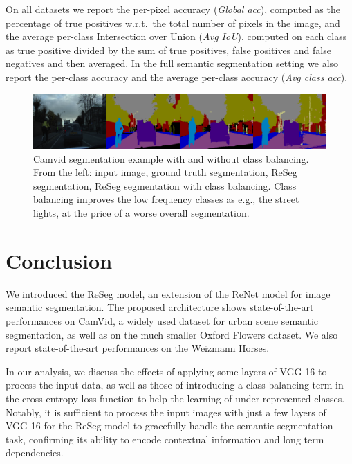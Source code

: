 On all datasets we report the per-pixel accuracy (\emph{Global acc}), computed
as the percentage of true positives w.r.t.\ the total number of pixels in the
image, and the average per-class Intersection over Union (\emph{Avg IoU}),
computed on each class as true positive divided by the sum of true positives,
false positives and false negatives and then averaged. In the full semantic
segmentation setting we also report the per-class accuracy and the average
per-class accuracy (\emph{Avg class acc}).

\begin{figure}[t]
    \centering
    \includegraphics[width=\textwidth]{img/reseg/camvid_classbal_diff.png}%
    \caption{Camvid segmentation example with and without class balancing. From
        the left: input image, ground truth segmentation, ReSeg segmentation,
        ReSeg segmentation with class balancing. Class balancing improves the
        low frequency classes as e.g., the street lights, at the price of a
        worse overall segmentation.}
    \label{fig:camvid_class_balance}
\end{figure}

\section{Conclusion}
We introduced the ReSeg model, an extension of the ReNet model for image
semantic segmentation. The proposed architecture shows state-of-the-art
performances on CamVid, a widely used dataset for urban scene semantic
segmentation, as well as on the much smaller Oxford Flowers dataset. We also
report state-of-the-art performances on the Weizmann Horses.

In our analysis, we discuss the effects of applying some layers of VGG-16 to
process the input data, as well as those of introducing a class balancing
term in the cross-entropy loss function to help the learning of
under-represented classes.
Notably, it is sufficient to process the input images with just a few layers of
VGG-16 for the ReSeg model to gracefully handle the semantic segmentation task, confirming
its ability to encode contextual information and long term dependencies.
